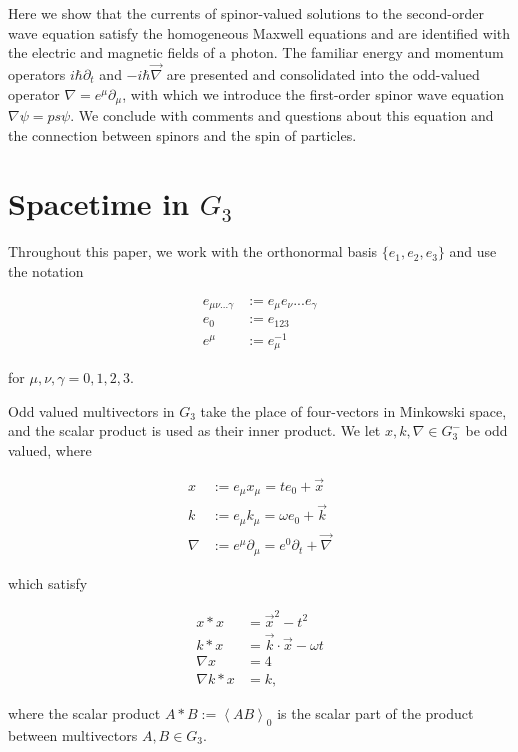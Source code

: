\documentclass{birkjour}
\begin{document}
Here we show that the currents of spinor-valued solutions to the second-order wave equation satisfy the homogeneous Maxwell equations and are identified with the electric and magnetic fields of a photon. The familiar energy and momentum operators $i \hbar \partial_t$ and $-i \hbar \vec \nabla$ are presented and consolidated into the odd-valued operator $\nabla = e^\mu \partial_\mu$, with which we introduce the first-order spinor wave equation $\nabla \psi = p s \psi.$ We conclude with comments and questions about this equation and the connection between spinors and the spin of particles.

\section{Spacetime in $G_3$}

Throughout this paper, we work with the orthonormal basis $\{e_1, e_2, e_3\}$ and use the notation 

\begin{align}
  e_{\mu \nu ... \gamma} &:= e_\mu e_\nu ... e_\gamma\\
  e_0 &:= e_{123}\\ 
  e^\mu &:= e_\mu^{-1} 
\end{align}

for $\mu, \nu, \gamma = 0,1,2,3$. 

Odd valued multivectors in $G_3$ take the place of four-vectors in Minkowski space, and the scalar product is used as their inner product. We let $x, k, \nabla \in G_3^-$ be odd valued, where

\begin{align}
  x &:= e_\mu x_\mu = t e_0 + \vec x \\
  k &:= e_\mu k_\mu = \omega e_0 + \vec k \\
  \nabla &:= e^\mu \partial_\mu = e^0 \partial_t + \vec \nabla
\end{align}

which satisfy

\begin{align}
  x * x &= \vec x^2 - t^2\\
  k*x &= \vec k \cdot \vec x - \omega t\\ 
  \nabla x &= 4 \\
  \nabla k * x &= k,
\end{align}

where the scalar product $A * B := \left< AB \right>_0$ is the scalar part of the product between multivectors $A, B \in G_3$.
\end{document}
